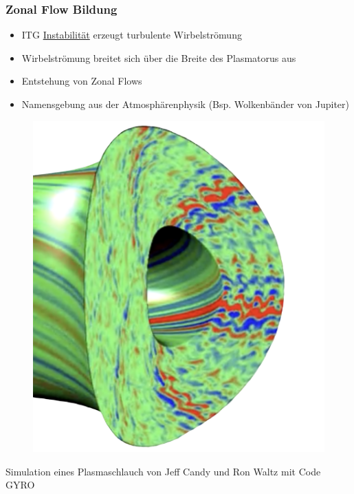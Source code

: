 \documentclass[compress,aspectratio=1610]{beamer}
\makeatletter
\let\UL\ul
\renewcommand\ul{
	\let\set@color\beamerorig@set@color 
	\let\reset@color\beamerorig@reset@color 
	\UL}
\makeatother
\begin{document}
	\begin{frame}
		\frametitle{Zonal Flow Bildung}
		\begin{minipage}{0.6\textwidth}\raggedleft
			\centering
			\begin{itemize}
				\item ITG \ul{Instabilität} erzeugt turbulente Wirbelströmung
				\item Wirbelströmung breitet sich über die Breite des Plasmatorus aus
				\item Entstehung von \alert{Zonal Flows}
				\item Namensgebung aus der Atmosphärenphysik (Bsp. Wolkenbänder von Jupiter)
			\end{itemize}
		\end{minipage}
		\begin{minipage}{0.3\textwidth}
			\begin{figure}%
				\href{https://www.youtube.com/watch?v=O6tUHzfj-zM}{\includegraphics[width=\textwidth]{Presentation/turbulence.png}}
			\end{figure}
			{\tiny Simulation eines Plasmaschlauch von Jeff Candy und Ron Waltz mit Code GYRO}
		\end{minipage}
	\end{frame}
\end{document}
